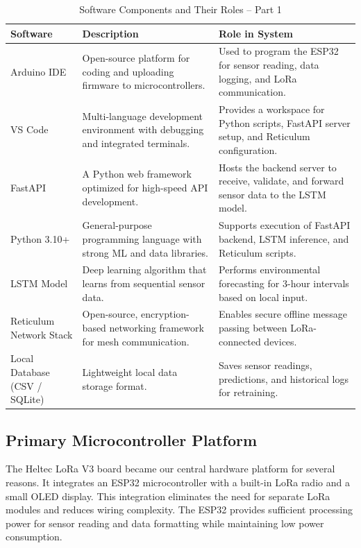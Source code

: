 \begin{table}[H]
\centering
\caption{Software Components and Their Roles – Part 1}
\label{tab:software_part1}
\begin{tabular}{|p{2.8cm}|p{6cm}|p{6cm}|}
\hline
\textbf{Software} & \textbf{Description} & \textbf{Role in System} \\
\hline
Arduino IDE & Open-source platform for coding and uploading firmware to microcontrollers. & Used to program the ESP32 for sensor reading, data logging, and LoRa communication. \\
\hline
VS Code & Multi-language development environment with debugging and integrated terminals. & Provides a workspace for Python scripts, FastAPI server setup, and Reticulum configuration. \\
\hline
FastAPI & A Python web framework optimized for high-speed API development. & Hosts the backend server to receive, validate, and forward sensor data to the LSTM model. \\
\hline
Python 3.10+ & General-purpose programming language with strong ML and data libraries. & Supports execution of FastAPI backend, LSTM inference, and Reticulum scripts. \\

\hline
LSTM Model & Deep learning algorithm that learns from sequential sensor data. & Performs environmental forecasting for 3-hour intervals based on local input. \\
\hline
Reticulum Network Stack & Open-source, encryption-based networking framework for mesh communication. & Enables secure offline message passing between LoRa-connected devices. \\
\hline
Local Database (CSV / SQLite) & Lightweight local data storage format. & Saves sensor readings, predictions, and historical logs for retraining. \\
\hline
\end{tabular}
\end{table}
\subsection{Primary Microcontroller Platform}

The Heltec LoRa V3 board became our central hardware platform for several reasons. It integrates an ESP32 microcontroller with a built-in LoRa radio and a small OLED display. This integration eliminates the need for separate LoRa modules and reduces wiring complexity. The ESP32 provides sufficient processing power for sensor reading and data formatting while maintaining low power consumption.


